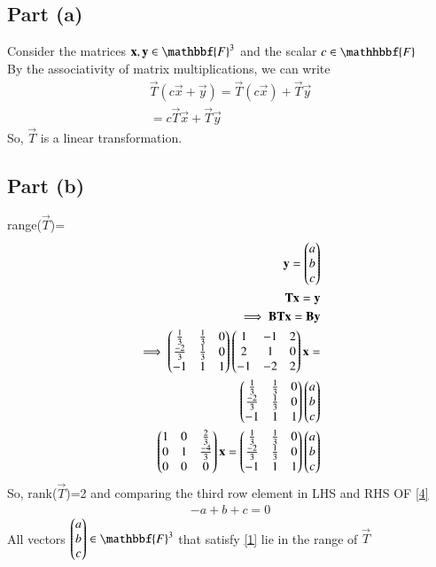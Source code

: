 \documentclass[journal,12pt,twocolumn]{IEEEtran}
\begin{document}
\subsection{Part (a)}
Consider the matrices $\vec{x},\vec{y} \in \mathbbf{F}^3$ and the scalar $c \in \mathhbbf{F}$\\
By the associativity of matrix multiplications, we can write
\begin{align}
    \vec{T}(c\vec{x}+\vec{y})=\vec{T}(c\vec{x})+\vec{T}\vec{y}\\
    =c\vec{T}\vec{x}+\vec{T}\vec{y}
\end{align}
So, $\vec{T}$ is a linear transformation.
\subsection{Part (b)}
range($\vec{T}$)=
\begin{align}
    \mathbf{y}=\begin{pmatrix}a\\b\\c\end{pmatrix}\\
    \mathbf{T}\mathbf{x}=\mathbf{y}\\
    \implies \mathbf{B}\mathbf{T}\mathbf{x}=\mathbf{B}\mathbf{y}\\
    \implies \begin{pmatrix}\frac{1}{3}&\frac{1}{3}&0\\\frac{-2}{3}&\frac{1}{3}&0\\-1&1&1\end{pmatrix}\begin{pmatrix}1&-1&2\\2&1&0\\-1&-2&2\end{pmatrix}\mathbf{x}=\\ \begin{pmatrix}\frac{1}{3}&\frac{1}{3}&0\\\frac{-2}{3}&\frac{1}{3}&0\\-1&1&1\end{pmatrix}\begin{pmatrix}a\\b\\c\end{pmatrix}\\
    \begin{pmatrix}1&0&\frac{2}{3}\\0&1&\frac{-4}{3}\\0&0&0\end{pmatrix}\mathbf{x}=\begin{pmatrix}\frac{1}{3}&\frac{1}{3}&0\\\frac{-2}{3}&\frac{1}{3}&0\\-1&1&1\end{pmatrix}\begin{pmatrix}a\\b\\c\end{pmatrix}\label{4}
\end{align}
So, rank($\vec{T}$)=2 and comparing the third row element in LHS and RHS OF \eqref{4}
\begin{align}
  -a+b+c=0 \label{1} 
\end{align}
All vectors $\myvec{a\\b\\c} \in \mathbbf{F}^3$ that satisfy \eqref{1} lie in the range of $\vec{T}$
\end{document}
